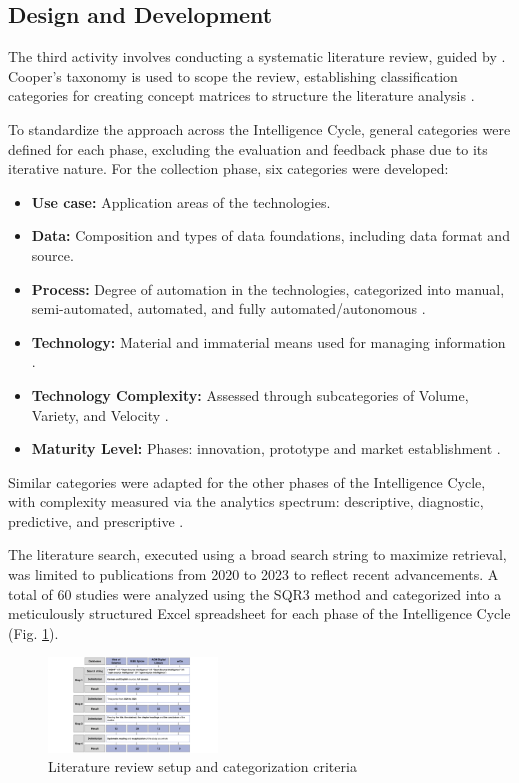 \documentclass[10pt]{article}
\begin{document}
\subsection{Design and Development}
The third activity involves conducting a systematic literature review, guided by \cite{Cleven.2009}. Cooper's taxonomy \cite{Cooper.1988} is used to scope the review, establishing classification categories for creating concept matrices to structure the literature analysis \cite{Webster.2002}.

To standardize the approach across the Intelligence Cycle, general categories were defined for each phase, excluding the evaluation and feedback phase due to its iterative nature. For the collection phase, six categories were developed:
\begin{itemize}
    \item \textbf{Use case:} Application areas of the technologies.
    \item \textbf{Data:} Composition and types of data foundations, including data format and source.
    \item \textbf{Process:} Degree of automation in the technologies, categorized into manual, semi-automated, automated, and fully automated/autonomous \cite{Duncheon.2002, Billings.1997, Endsley.1999}.
    \item \textbf{Technology:} Material and immaterial means used for managing information \cite{Bleck.2004}.
    \item \textbf{Technology Complexity:} Assessed through subcategories of Volume, Variety, and Velocity \cite{Elgendy.2014, Singh.2012}.
    \item \textbf{Maturity Level:} Phases: innovation, prototype and  market establishment \cite{Stich.2022}.
\end{itemize}

Similar categories were adapted for the other phases of the Intelligence Cycle, with complexity measured via the analytics spectrum: descriptive, diagnostic, predictive, and prescriptive \cite{Delen.2013}.

The literature search, executed using a broad search string to maximize retrieval, was limited to publications from 2020 to 2023 to reflect recent advancements. A total of 60 studies were analyzed using the SQR3 method \cite{Robinson.1970} and categorized into a meticulously structured Excel spreadsheet for each phase of the Intelligence Cycle (Fig. \ref{fig:LiteratureReview}).

\begin{figure}[t]
    \centering
    \includegraphics[width=0.4\textwidth]{PDF/images/crop_Kategorisierungskriterien und Literraturreviewaufbau}
    \caption{Literature review setup and categorization criteria}
    \label{fig:LiteratureReview}
\end{figure}
\end{document}
